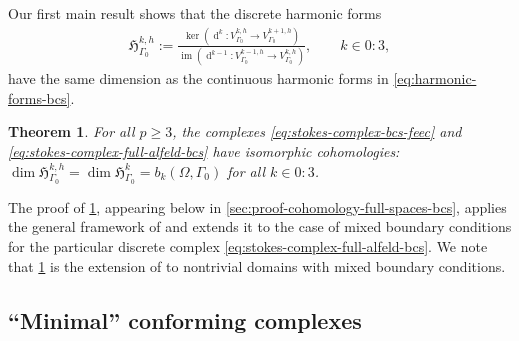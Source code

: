 \documentclass{mcom-l}
\newtheorem{theorem}{Theorem}[section]
\theoremstyle{definition}
\theoremstyle{remark}
\numberwithin{equation}{section}
\newcommand{\harmonic}[1]{\mathfrak{#1}}
\DeclareMathOperator{\dee}{d}
\DeclareMathOperator{\image}{im}
\begin{document}
Our first main result shows that the discrete harmonic forms 
\begin{align}
	\label{eq:harmonic-forms-full-alfeld-bcs}
	\harmonic{H}^{k, h}_{\Gamma_0} := \frac{\ker(\dee^k : V_{\Gamma_0}^{k, h} \to V_{\Gamma_0}^{k+1, h})}{ 
		\image(\dee^{k-1} : V_{\Gamma_0}^{k-1, h} \to V_{\Gamma_0}^{k, h})}, \qquad 
	k \in 0:3,
\end{align}
have the same dimension as the 
continuous harmonic forms in \cref{eq:harmonic-forms-bcs}.

\begin{theorem}
	\label{thm:cohomology-full-alfeld-bcs}
	For all $p \geq 3$, the complexes \cref{eq:stokes-complex-bcs-feec}
	and \cref{eq:stokes-complex-full-alfeld-bcs}
	have isomorphic cohomologies: $\dim \harmonic{H}^{k, h}_{\Gamma_0} 
	= \dim \harmonic{H}^{k}_{\Gamma_0} = b_k(\Omega, \Gamma_0)$ for all $k \in 0:3$. 
\end{theorem}

\noindent The proof of \cref{thm:cohomology-full-alfeld-bcs},
appearing below in \cref{sec:proof-cohomology-full-spaces-bcs}, applies the 
general framework of \cite{HuLiangLin25} and extends it to the case of 
mixed boundary conditions 
for the particular discrete complex
\cref{eq:stokes-complex-full-alfeld-bcs}. We note 
that \cref{thm:cohomology-full-alfeld-bcs} is the extension of 
\cite[Theorem 5.1]{FuGuzmanNeilan20} to nontrivial domains with mixed 
boundary conditions. 

\subsection{``Minimal'' conforming complexes}
\label{sec:minimal-complexes-results}
\end{document}
